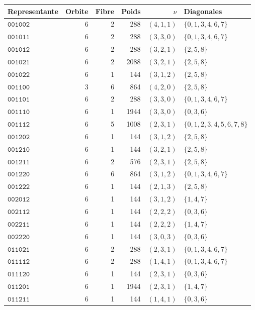 \begin{table}[!htbp]
\centering\fontsize{8.8}{10.1}\selectfont
\setlength{\tabcolsep}{4pt}\renewcommand{\arraystretch}{1.04}
\begin{tabular}{@{}lrrrrl@{}}
\toprule Representante&Orbite&Fibre&Poids&\(\nu\)&Diagonales\\\midrule
\(\mathtt{001002}\)&6&2&288&\((4,1,1)\)&\(\{0,1,3,4,6,7\}\)\\
\(\mathtt{001011}\)&6&2&288&\((3,3,0)\)&\(\{0,1,3,4,6,7\}\)\\
\(\mathtt{001012}\)&6&2&288&\((3,2,1)\)&\(\{2,5,8\}\)\\
\(\mathtt{001021}\)&6&2&2088&\((3,2,1)\)&\(\{2,5,8\}\)\\
\(\mathtt{001022}\)&6&1&144&\((3,1,2)\)&\(\{2,5,8\}\)\\
\(\mathtt{001100}\)&3&6&864&\((4,2,0)\)&\(\{2,5,8\}\)\\
\(\mathtt{001101}\)&6&2&288&\((3,3,0)\)&\(\{0,1,3,4,6,7\}\)\\
\(\mathtt{001110}\)&6&1&1944&\((3,3,0)\)&\(\{0,3,6\}\)\\
\(\mathtt{001112}\)&6&5&1008&\((2,3,1)\)&\(\{0,1,2,3,4,5,6,7,8\}\)\\
\(\mathtt{001202}\)&6&1&144&\((3,1,2)\)&\(\{2,5,8\}\)\\
\(\mathtt{001210}\)&6&1&144&\((3,2,1)\)&\(\{2,5,8\}\)\\
\(\mathtt{001211}\)&6&2&576&\((2,3,1)\)&\(\{2,5,8\}\)\\
\(\mathtt{001220}\)&6&6&864&\((3,1,2)\)&\(\{0,1,3,4,6,7\}\)\\
\(\mathtt{001222}\)&6&1&144&\((2,1,3)\)&\(\{2,5,8\}\)\\
\(\mathtt{002012}\)&6&1&144&\((3,1,2)\)&\(\{1,4,7\}\)\\
\(\mathtt{002112}\)&6&1&144&\((2,2,2)\)&\(\{0,3,6\}\)\\
\(\mathtt{002211}\)&6&1&144&\((2,2,2)\)&\(\{1,4,7\}\)\\
\(\mathtt{002220}\)&6&1&144&\((3,0,3)\)&\(\{0,3,6\}\)\\
\(\mathtt{011021}\)&6&2&288&\((2,3,1)\)&\(\{0,1,3,4,6,7\}\)\\
\(\mathtt{011112}\)&6&2&288&\((1,4,1)\)&\(\{0,1,3,4,6,7\}\)\\
\(\mathtt{011120}\)&6&1&144&\((2,3,1)\)&\(\{0,3,6\}\)\\
\(\mathtt{011201}\)&6&1&1944&\((2,3,1)\)&\(\{1,4,7\}\)\\
\(\mathtt{011211}\)&6&1&144&\((1,4,1)\)&\(\{0,3,6\}\)\\

\end{tabular}
\end{table}
